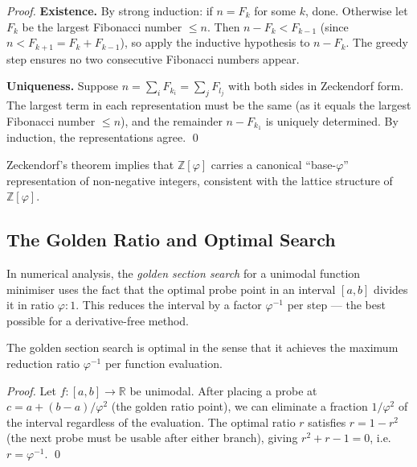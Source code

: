 \begin{proof}
  \textbf{Existence.} By strong induction: if $n = F_k$ for some $k$,
  done.  Otherwise let $F_k$ be the largest Fibonacci number $\leq n$.
  Then $n - F_k < F_{k-1}$ (since $n < F_{k+1} = F_k + F_{k-1}$),
  so apply the inductive hypothesis to $n - F_k$.  The greedy step
  ensures no two consecutive Fibonacci numbers appear.

  \textbf{Uniqueness.} Suppose $n = \sum_{i} F_{k_i} = \sum_j F_{l_j}$
  with both sides in Zeckendorf form.  The largest term in each
  representation must be the same (as it equals the largest Fibonacci
  number $\leq n$), and the remainder $n - F_{k_1}$ is uniquely
  determined.  By induction, the representations agree.  \qed
\end{proof}

\begin{remark}
  Zeckendorf's theorem implies that $\mathbb{Z}[\varphi]$ carries a
  canonical ``base-$\varphi$'' representation of non-negative integers,
  consistent with the lattice structure of $\mathbb{Z}[\varphi]$.
\end{remark}

\subsection{The Golden Ratio and Optimal Search}

In numerical analysis, the \emph{golden section search} for a unimodal
function minimiser uses the fact that the optimal probe point in an
interval $[a, b]$ divides it in ratio $\varphi : 1$.  This reduces
the interval by a factor $\varphi^{-1}$ per step — the best possible
for a derivative-free method.

\begin{proposition}\label{prop:golden-search}
  The golden section search is optimal in the sense that it achieves
  the maximum reduction ratio $\varphi^{-1}$ per function evaluation.
\end{proposition}

\begin{proof}
  Let $f:[a,b]\to\mathbb{R}$ be unimodal.  After placing a probe at
  $c = a + (b-a)/\varphi^2$ (the golden ratio point), we can eliminate
  a fraction $1/\varphi^2$ of the interval regardless of the evaluation.
  The optimal ratio $r$ satisfies $r = 1 - r^2$ (the next probe must
  be usable after either branch), giving $r^2 + r - 1 = 0$, i.e.\
  $r = \varphi^{-1}$.  \qed
\end{proof}

